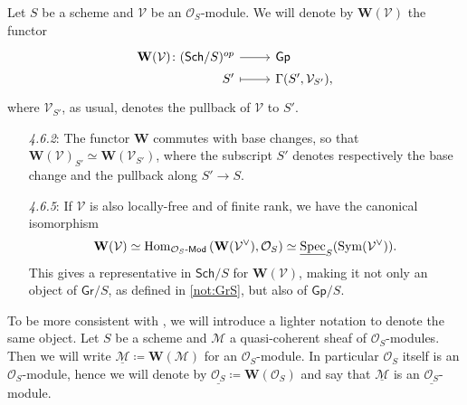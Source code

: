 \begin{defn}\label{defn:fppfSheafAssociatedtoMod}
	Let $S$ be a scheme and $\mathcal{V}$ be an $\mathcal{O}_{ S }$-module.
	We will denote by $\mathbf{W}(\mathcal{V})$ the functor
	\begin{equation*}
	\begin{tikzcd}[row sep = 0ex
		,/tikz/column 1/.append style={anchor=base east}
		,/tikz/column 2/.append style={anchor=base west}]
		\mathbf{W}(\mathcal{V})\colon 
		(\mathsf{Sch}/S)^{op} \arrow[r, "", rightarrow] &
		\mathsf{Gp} \\
		S' \arrow[r, "", mapsto] & 
		\Gamma(S', \mathcal{V}_{S'})
	,\end{tikzcd}
	\end{equation*} 
	where $\mathcal{V}_{S'}$, as usual, denotes the pullback of
	$\mathcal{V}$ to $S'$.
\end{defn}


\begin{rem}\leavevmode\vspace{-0.2\baselineskip}
\begin{enumerate}
\item[\emph{4.6.2}:]
	The functor $\mathbf{W}$ commutes with base changes,
	so that $\mathbf{W}(\mathcal{V})_{S'} \simeq \mathbf{W}(\mathcal{V}_{S'})$,
	where the subscript $S'$ denotes respectively the base change 
	and the pullback along $S' \to S$.

\item[\emph{4.6.5}:]
	If $\mathcal{V}$ is also  locally-free and of finite rank, we have the canonical isomorphism
	\begin{equation*}
		\mathbf{W}(\mathcal{V}) \simeq
		\operatorname{Hom}_{ \mathcal{O}_{ S }\text{-}\mathsf{Mod} }
		\left(\mathbf{W}(\mathcal{V}^\vee) , \mathcal{O}_{ S } \right) \simeq
		\underline{\operatorname{Spec}}_S(\operatorname{Sym}(\mathcal{V}^\vee))
	.\end{equation*}
	This gives a representative in $\mathsf{Sch}/S$ for 
	$\mathbf{W}(\mathcal{V})$, making it not only an object of $\mathsf{Gr}/S$,
	as defined in \cref{not:GrS}, but also of $\mathsf{Gp}/S$.
\end{enumerate}
\end{rem}


\begin{ntt}\label{not:fppfOsModule}
	To be more consistent with \cite{Messing}, we will introduce a 
	lighter notation to denote the same object.
	Let $S$ be a scheme and $\mathcal{M}$ a quasi-coherent sheaf of $\mathcal{O}_{ S }$-modules.
	Then we will write $\underline{\mathcal{M}} \coloneqq \mathbf{W}(\mathcal{M})$ for
	an $\mathcal{O}_{ S }$-module.
	In particular $\mathcal{O}_{ S }$ itself is an $\mathcal{O}_{ S }$-module, hence
	we will denote by $\underline{\mathcal{O}_{ S }} \coloneqq \mathbf{W}(\mathcal{O}_{ S })$
	and say that $\underline{\mathcal{M}}$ is an $\underline{\mathcal{O}_{ S }}$-module.
\end{ntt}


